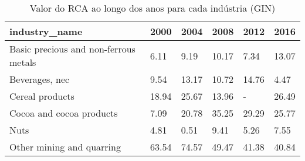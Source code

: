\begin{table}
\centering
\caption{Valor do RCA ao longo dos anos para cada indústria (GIN)}
\begin{tabular}{p{6cm}p{1.5cm}p{1.5cm}p{1.5cm}p{1.5cm}p{1.5cm}}
\toprule
                        industry\_name &  2000 &  2004 &  2008 &  2012 &  2016 \\
\midrule
Basic precious and non-ferrous metals &  6.11 &  9.19 & 10.17 &  7.34 & 13.07 \\
                       Beverages, nec &  9.54 & 13.17 & 10.72 & 14.76 &  4.47 \\
                      Cereal products & 18.94 & 25.67 & 13.96 &     - & 26.49 \\
             Cocoa and cocoa products &  7.09 & 20.78 & 35.25 & 29.29 & 25.77 \\
                                 Nuts &  4.81 &  0.51 &  9.41 &  5.26 &  7.55 \\
            Other mining and quarring & 63.54 & 74.57 & 49.47 & 41.38 & 40.84 \\
\bottomrule
\end{tabular}
\end{table}
